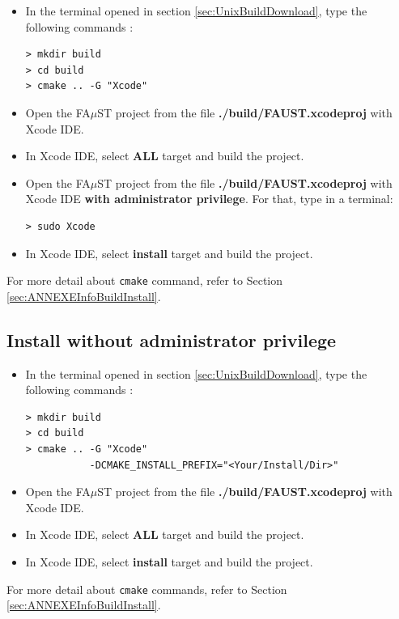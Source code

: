 \begin{itemize}
\item In the terminal opened in section 
\ref{sec:UnixBuildDownload}, type the following commands : 
\begin{lstlisting}
> mkdir build
> cd build
> cmake .. -G "Xcode"
\end{lstlisting}

\item Open the FA$\mu$ST project from the file \textbf{./build/FAUST.xcodeproj} with Xcode IDE. 
\item In Xcode IDE, select \textbf{ALL} target and build the project. 
\item Open the FA$\mu$ST project from the file \textbf{./build/FAUST.xcodeproj} with Xcode IDE \textbf{with administrator privilege}. For that, type in a terminal:
\begin{lstlisting}
> sudo Xcode
\end{lstlisting}
\item In Xcode IDE, select \textbf{install} target and build the project. 
\end{itemize}

For more detail about \texttt{cmake} command, refer to Section \ref{sec:ANNEXEInfoBuildInstall}.


\subsection{Install without administrator privilege}\label{sec:XcodeUnixBuildInstallNOAdmin}
 
\begin{itemize}

\item In the terminal opened in section 
\ref{sec:UnixBuildDownload}, type the following commands : 
\begin{lstlisting}
> mkdir build
> cd build
> cmake .. -G "Xcode" 
		   -DCMAKE_INSTALL_PREFIX="<Your/Install/Dir>"
\end{lstlisting}

\item Open the FA$\mu$ST project from the file \textbf{./build/FAUST.xcodeproj} with Xcode IDE. 
\item In Xcode IDE, select \textbf{ALL} target and build the project. 
\item In Xcode IDE, select \textbf{install} target and build the project. 
\end{itemize}

For more detail about \texttt{cmake} commands, refer to Section \ref{sec:ANNEXEInfoBuildInstall}.


